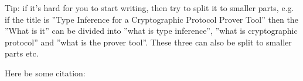 \documentclass[..thesis.tex]{subfiles}
\begin{document}


Tip: if it's hard for you to start writing, then try to split it to smaller parts, e.g. if the title is ''Type Inference for a Cryptographic Protocol Prover Tool'' then the ''What is it'' can be divided into ''what is type inference'', ''what is cryptographic protocol'' and ''what is the prover tool''. These three can also be split to smaller parts etc.

Here be some citation: \cite{someref_2018}
\end{document}
